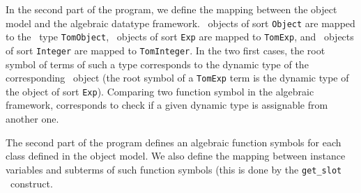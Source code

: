 \noindent
In the second part of the program, we define the mapping between the
object model and the algebraic datatype framework.
\Java\ objects of sort \texttt{Object} are mapped to the \TOM\ type
\texttt{TomObject}, \Java\ objects of sort \texttt{Exp} are
mapped to \texttt{TomExp}, and \Java\ objects of sort \texttt{Integer} are
mapped to \texttt{TomInteger}.
In the two first cases, the root symbol of terms of such a type
corresponds to the dynamic type of the corresponding \Java\ object
(the root symbol of a \texttt{TomExp} term is the dynamic type of the
object of sort \texttt{Exp}). 
Comparing two function symbol in the algebraic framework,
corresponds to check if a given dynamic type is assignable from
another one.


\noindent
The second part of the program defines an algebraic function symbols
for each class defined in the object model. We also define the mapping
between instance variables and subterms of such function symbols (this
is done by the \texttt{get\_slot} \TOM\ construct.

